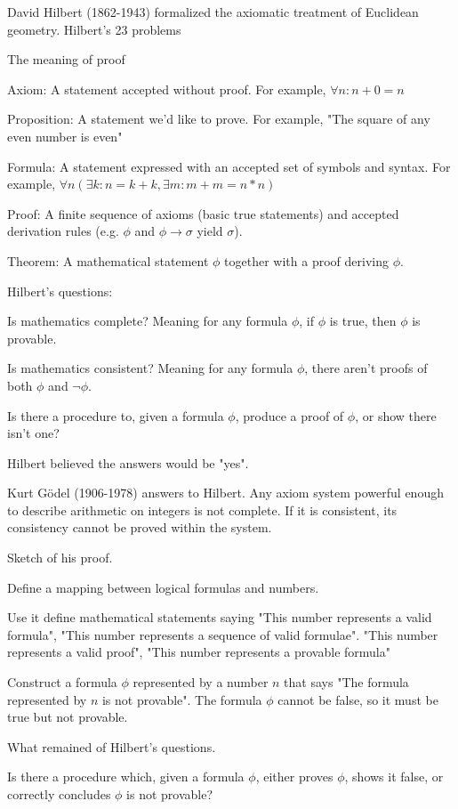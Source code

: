 \documentclass{article}
\begin{document}
David Hilbert (1862-1943) formalized the axiomatic treatment of Euclidean geometry. Hilbert's 23 problems

The meaning of proof

Axiom: A statement accepted without proof. For example, $\forall n: n + 0 = n$

Proposition: A statement we'd like to prove. For example, "The square of any even number is even"

Formula: A statement expressed with an accepted set of symbols and syntax. For example, $\forall n(\exists k : n = k + k, \exists m: m + m = n*n)$

Proof: A finite sequence of axioms (basic true statements) and accepted derivation rules (e.g. $\phi$ and $\phi \to \sigma$ yield $\sigma$). 

Theorem: A mathematical statement $\phi$ together with a proof deriving $\phi$.

Hilbert's questions:

Is mathematics complete? Meaning for any formula $\phi$, if $\phi$ is true, then $\phi$ is provable. 

Is mathematics consistent? Meaning for any formula $\phi$, there aren't proofs of both $\phi$ and $\neg \phi$.

Is there a procedure to, given a formula $\phi$, produce a proof of $\phi$, or show there isn't one?

Hilbert believed the answers would be "yes". 

Kurt Gödel (1906-1978) answers to Hilbert. Any axiom system powerful enough to describe arithmetic on integers is not complete. If it is consistent, its consistency cannot be proved within the system. 

Sketch of his proof. 

Define a mapping between logical formulas and numbers. 

Use it define mathematical statements saying "This number represents a valid formula", "This number represents a sequence of valid formulae". "This number represents a valid proof", "This number represents a provable formula"

Construct a formula $\phi$ represented by a number $n$ that says "The formula represented by $n$ is not provable". The formula $\phi$ cannot be false, so it must be true but not provable. 

What remained of Hilbert's questions. 

Is there a procedure which, given a formula $\phi$, either proves $\phi$, shows it false, or correctly concludes $\phi$ is not provable?
\end{document}
